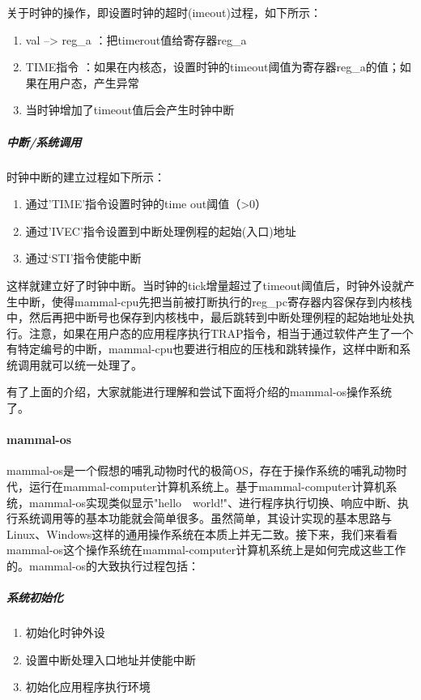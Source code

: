 关于时钟的操作，即设置时钟的超时(imeout)过程，如下所示：
\begin{enumerate}
\item val --> reg\_a  ：把timerout值给寄存器reg\_a
\item TIME指令 ：如果在内核态，设置时钟的timeout阈值为寄存器reg\_a的值；如果在用户态，产生异常
\item 当时钟增加了timeout值后会产生时钟中断
\end{enumerate}

\subparagraph{中断/系统调用}

时钟中断的建立过程如下所示：
\begin{enumerate}
\item 通过'TIME'指令设置时钟的time out阈值（>0）
\item 通过'IVEC'指令设置到中断处理例程的起始(入口)地址
\item 通过‘STI’指令使能中断
\end{enumerate}

这样就建立好了时钟中断。当时钟的tick增量超过了timeout阈值后，时钟外设就产生中断，使得mammal-cpu先把当前被打断执行的reg\_pc寄存器内容保存到内核栈中，然后再把中断号也保存到内核栈中，最后跳转到中断处理例程的起始地址处执行。注意，如果在用户态的应用程序执行TRAP指令，相当于通过软件产生了一个有特定编号的中断，mammal-cpu也要进行相应的压栈和跳转操作，这样中断和系统调用就可以统一处理了。

有了上面的介绍，大家就能进行理解和尝试下面将介绍的mammal-os操作系统了。

\paragraph{mammal-os}
mammal-os是一个假想的哺乳动物时代的极简OS，存在于操作系统的哺乳动物时代，运行在mammal-computer计算机系统上。基于mammal-computer计算机系统，mammal-os实现类似显示"hello　world!"、进行程序执行切换、响应中断、执行系统调用等的基本功能就会简单很多。虽然简单，其设计实现的基本思路与Linux、Windows这样的通用操作系统在本质上并无二致。接下来，我们来看看mammal-os这个操作系统在mammal-computer计算机系统上是如何完成这些工作的。mammal-os的大致执行过程包括：
\subparagraph{系统初始化}	

\begin{enumerate}
  \item 初始化时钟外设	
  \item 设置中断处理入口地址并使能中断
  \item 初始化应用程序执行环境
\end{enumerate}

